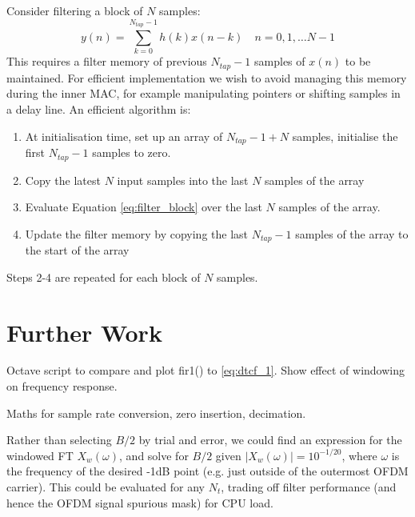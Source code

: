\documentclass{article}
\begin{document}
Consider filtering a block of $N$ samples:
\begin{equation} \label{eq:filter_block}
y(n) = \sum_{k=0}^{N_{tap}-1} h(k) x(n-k) \quad n=0,1, \ldots N-1
\end{equation}
This requires a filter memory of previous $N_{tap}-1$ samples of $x(n)$ to be maintained.  For efficient implementation we wish to avoid managing this memory during the inner MAC, for example manipulating pointers or shifting samples in a delay line. An efficient algorithm is:
\begin{enumerate}
\item At initialisation time, set up an array of $N_{tap}-1+N$ samples, initialise the first $N_{tap}-1$ samples to zero.
\item Copy the latest $N$ input samples into the last $N$ samples of the array
\item Evaluate Equation \ref{eq:filter_block} over the last $N$ samples of the array.
\item Update the filter memory by copying the last $N_{tap}-1$ samples of the array to the start of the array
\end{enumerate}
Steps 2-4 are repeated for each block of $N$ samples.

\section {Further Work}

Octave script to compare and plot fir1() to \ref{eq:dtcf_1}. Show effect of windowing on frequency response.

Maths for sample rate conversion, zero insertion, decimation.

Rather than selecting $B/2$ by trial and error, we could find an expression for the windowed FT $X_w(\omega)$, and solve for $B/2$ given $|X_w(\omega)|=10^{-1/20}$, where $\omega$ is the frequency of the desired -1dB point (e.g. just outside of the outermost OFDM carrier).  This could be evaluated for any $N_t$, trading off filter performance (and hence the OFDM signal spurious mask) for CPU load.  



\end{document}
